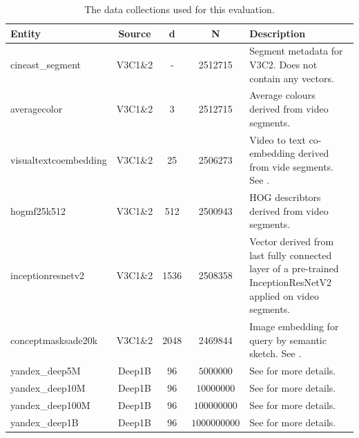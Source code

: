 \begin{table}
    \begin{tabular}{ | l | c | c | c | p{5cm} |}
        \hline
        \textbf{Entity} & \textbf{Source} & \textbf{d} & \textbf{N} & \textbf{Description} \\
        \hline
        \hline
        cineast\_segment & V3C1\&2  & - & 2512715 & Segment metadata for V3C2. Does not contain any vectors. \\ 
        \hline
        averagecolor & V3C1\&2  & 3 & 2512715 & Average colours derived from video segments. \\ 
        \hline
        visualtextcoembedding & V3C1\&2 & 25 & 2506273 & Video to text co-embedding derived from vide segments. See \cite{Spiess:2021Competitive}. \\
        \hline
        hogmf25k512  & V3C1\&2  & 512 & 2500943 & HOG \cite{Bay:2006surf} describtors derived from video segments. \\
        \hline
        inceptionresnetv2 & V3C1\&2  & 1536 & 2508358 & Vector derived from last fully connected layer of a pre-trained InceptionResNetV2 applied on video segments.\\
        \hline
        conceptmasksade20k & V3C1\&2 & 2048 & 2469844 & Image embedding for query by semantic sketch. See \cite{Rossetto:2019Query}. \\
        \hline
        yandex\_deep5M  & Deep1B  & 96 & $5000000$ & See \cite{Babenko:2016Efficient} for more details. \\
        \hline
        yandex\_deep10M  & Deep1B & 96 & $10000000$ & See \cite{Babenko:2016Efficient} for more details. \\
        \hline
        yandex\_deep100M  & Deep1B & 96 & $100000000$ & See \cite{Babenko:2016Efficient} for more details. \\
        \hline
        yandex\_deep1B  & Deep1B & 96 & $1000000000$ & See \cite{Babenko:2016Efficient} for more details. \\
        \hline
        \hline
    \end{tabular}
    \caption{The data collections used for this evaluation. }
    \label{table:datasets}
\end{table}

